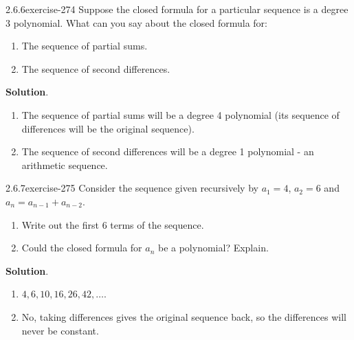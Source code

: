 \documentclass[twoside,11pt,]{book}
\numberwithin{equation}{chapter}
\begin{document}
\begin{divisionsolution}{2.6.6}{}{exercise-274}%
\hypertarget{p-3771}{}%
Suppose the closed formula for a particular sequence is a degree 3 polynomial. What can you say about the closed formula for:\leavevmode%
\begin{enumerate}[label=(\alph*)]
\item\hypertarget{li-2006}{}\hypertarget{p-3772}{}%
The sequence of partial sums.%
\item\hypertarget{li-2007}{}\hypertarget{p-3773}{}%
The sequence of second differences.%
\end{enumerate}
%
\par\smallskip%
\noindent\textbf{Solution}.\quad%
\hypertarget{p-3774}{}%
\leavevmode%
\begin{enumerate}[label=(\alph*)]
\item\hypertarget{li-2008}{}\hypertarget{p-3775}{}%
The sequence of partial sums will be a degree 4 polynomial (its sequence of differences will be the original sequence).%
\item\hypertarget{li-2009}{}\hypertarget{p-3776}{}%
The sequence of second differences will be a degree 1 polynomial - an arithmetic sequence.%
\end{enumerate}
%
\end{divisionsolution}%
\begin{divisionsolution}{2.6.7}{}{exercise-275}%
\hypertarget{p-3777}{}%
Consider the sequence given recursively by \(a_1 = 4\), \(a_2 = 6\) and \(a_n = a_{n-1} + a_{n-2}\).\leavevmode%
\begin{enumerate}[label=(\alph*)]
\item\hypertarget{li-2010}{}\hypertarget{p-3778}{}%
Write out the first 6 terms of the sequence.%
\item\hypertarget{li-2011}{}\hypertarget{p-3779}{}%
Could the closed formula for \(a_n\) be a polynomial? Explain.%
\end{enumerate}
%
\par\smallskip%
\noindent\textbf{Solution}.\quad%
\hypertarget{p-3780}{}%
\leavevmode%
\begin{enumerate}[label=(\alph*)]
\item\hypertarget{li-2012}{}\(4, 6, 10, 16, 26, 42, \ldots\).%
\item\hypertarget{li-2013}{}\hypertarget{p-3781}{}%
No, taking differences gives the original sequence back, so the differences will never be constant.%
\end{enumerate}
%
\end{divisionsolution}%
\end{document}
